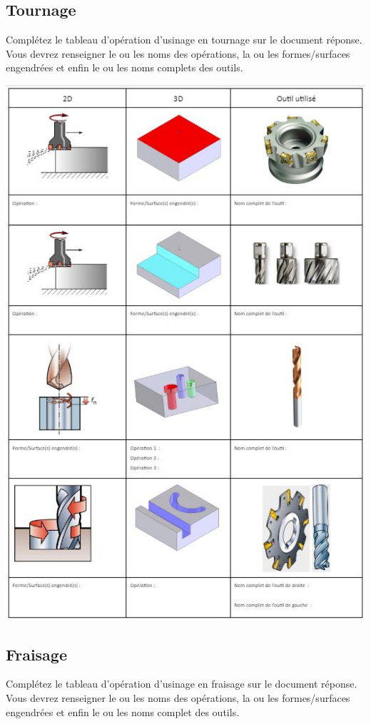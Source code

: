 \documentclass[12pt,a4paper]{article} %
\begin{document}
\subsection{Tournage}
\begin{exo} Complétez le tableau d'opération d'usinage en tournage sur le document réponse. Vous devrez renseigner le ou les noms des opérations, la ou les formes/surfaces engendrées et enfin le ou les noms complets des outils.  \end{exo}
\begin{center}
\includegraphics[scale=0.8]{FR1.JPG}
\end{center}

\subsection{Fraisage}
\begin{exo} Complétez le tableau d'opération d'usinage en fraisage sur le document réponse. Vous devrez renseigner le ou les noms des opérations, la ou les formes/surfaces engendrées et enfin le ou les noms complet des outils.  \end{exo}
\end{document}
